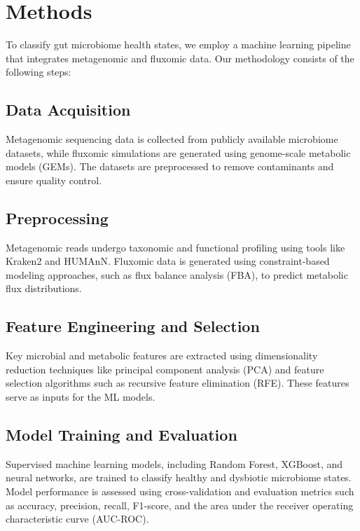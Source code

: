 \section{Methods}

To classify gut microbiome health states, we employ a machine learning pipeline that integrates metagenomic and fluxomic data. Our methodology consists of the following steps:

\subsection{Data Acquisition}
Metagenomic sequencing data is collected from publicly available microbiome datasets, while fluxomic simulations are generated using genome-scale metabolic models (GEMs). The datasets are preprocessed to remove contaminants and ensure quality control.

\subsection{Preprocessing}
Metagenomic reads undergo taxonomic and functional profiling using tools like Kraken2 and HUMAnN. Fluxomic data is generated using constraint-based modeling approaches, such as flux balance analysis (FBA), to predict metabolic flux distributions.

\subsection{Feature Engineering and Selection}
Key microbial and metabolic features are extracted using dimensionality reduction techniques like principal component analysis (PCA) and feature selection algorithms such as recursive feature elimination (RFE). These features serve as inputs for the ML models.

\subsection{Model Training and Evaluation}
Supervised machine learning models, including Random Forest, XGBoost, and neural networks, are trained to classify healthy and dysbiotic microbiome states. Model performance is assessed using cross-validation and evaluation metrics such as accuracy, precision, recall, F1-score, and the area under the receiver operating characteristic curve (AUC-ROC).
